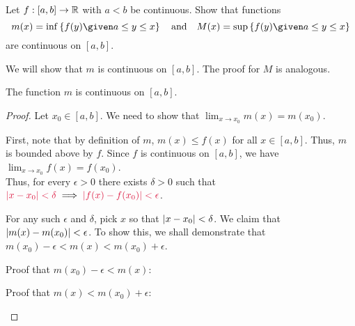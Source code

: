\begin{problem}
  Let $f : [a, b] \to \mathbb{R}$ with $a < b$ be continuous.
  Show that functions
  \[
    m(x) = \inf \set{ f(y) \given a \leq y \leq x } \quad \text{and} \quad
    M(x) = \sup \set{ f(y) \given a \leq y \leq x }
  \]
  are continuous on $[a, b]$.
\end{problem}

\begin{answer}
  We will show that $m$ is continuous on $[a, b]$.
  The proof for $M$ is analogous.

  \begin{claim}
    The function $m$ is continuous on $[a, b]$.
    \begin{proof}
      Let $x_0 \in [a, b]$.
      We need to show that
      $\displaystyle \lim_{x \to x_0} m(x) = m(x_0)$.


      First, note that by definition of $m$,
      $m(x) \leq f(x)$ for all $x \in [a, b]$.
      Thus, $m$ is bounded above by $f$.
      Since $f$ is continuous on $[a, b]$, we have
      $\displaystyle \lim_{x \to x_0} f(x) = f(x_0)$.\\
      Thus, for every $\epsilon > 0$
      there exists $\delta > 0$ such that
      $\crim{\abs{x - x_0} < \delta} \implies \crim{\abs{f(x) - f(x_0)} < \epsilon}$.
      
      \step
      For any such $\epsilon$ and $\delta$, pick $x$ so that $\lvert x - x_0\rvert < \delta$.
      We claim that $\lvert m(x) - m(x_0)\rvert < \epsilon$.
      To show this, we shall demonstrate that $m(x_0) - \epsilon < m(x) < m(x_0) + \epsilon$.

      \begin{enumarabic}
        \item Proof that $m(x_0) - \epsilon < m(x)$:
        \item Proof that $m(x) < m(x_0) + \epsilon$:
      \end{enumarabic}

    \end{proof}
  \end{claim}
\end{answer}
